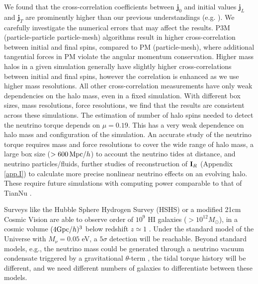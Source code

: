\documentclass[aps,prd,twocolumn,amsmath,amssymb,amsfont,superscriptaddress,nofootinbib]{revtex4-1}
\newcommand{\bs}{\boldsymbol}
\newcommand{\I}{\bold{I}}
\newcommand{\spin}{\bs{j}}
\begin{document}
We found that the cross-correlation coefficients between $\spin_0$ and initial values $\spin_L$ and $\spin_T$ are prominently higher than our previous understandings (e.g. \citep{2000ApJ...532L...5L}). 
We carefully investigate the numerical errors that may affect the results. 
P3M (particle-particle particle-mesh) algorithms result in higher cross-correlation between initial and final spins, compared to PM (particle-mesh), where additional tangential forces in PM violate the angular momentum conservation. 
Higher mass halos in a given simulation generally have slightly higher cross-correlations between initial and final spins, however the correlation is enhanced as we use higher mass resolutions. 
All other cross-correlation measurements have only weak dependencies on the halo mass, even in a fixed simulation. 
With different box sizes, mass resolutions, force resolutions, we find that the results are consistent across these simulations. 
The estimation of number of halo spins needed to detect the neutrino torque depends on $\mu=0.19$. This has a very weak dependence on halo mass and configuration of the simulation. An accurate study of the neutrino torque requires mass and force resolutions to cover the wide range of halo mass, a large box size ($>600\,{\rm Mpc}/h$) to account the neutrino tides at distance, and neutrino particles/fluids, further studies of reconstruction of $\I_R$ (Appendix \ref{app.I}) to calculate more precise nonlinear neutrino effects on an evolving halo. These require future simulations with computing power comparable to that of TianNu \citep{2017RAA....17...85E}.

Surveys like the Hubble Sphere Hydrogen Survey (HSHS) \citep{2006astro.ph..6104P} or a modified 21cm Cosmic Vision \citep{2018arXiv180207216D} are able to observe order of $10^9$ HI galaxies ($>10^{12}M_\odot$), 
in a cosmic volume $(4{\rm Gpc}/h)^3$ below redshift $z\simeq 1$ \citep{2004MNRAS.350.1210Z}. 
Under the standard model of the Universe with $M_\nu=0.05$ eV, a $5\sigma$ detection will be reachable.
Beyond standard models, e.g., the neutrino mass could be
generated through a neutrino vacuum condensate triggered by a gravitational $\theta$-term
\citep{2016PhRvD..93k3002D}, the tidal torque history will be different, 
and we need different numbers of galaxies to differentiate between these models.

\end{document}
